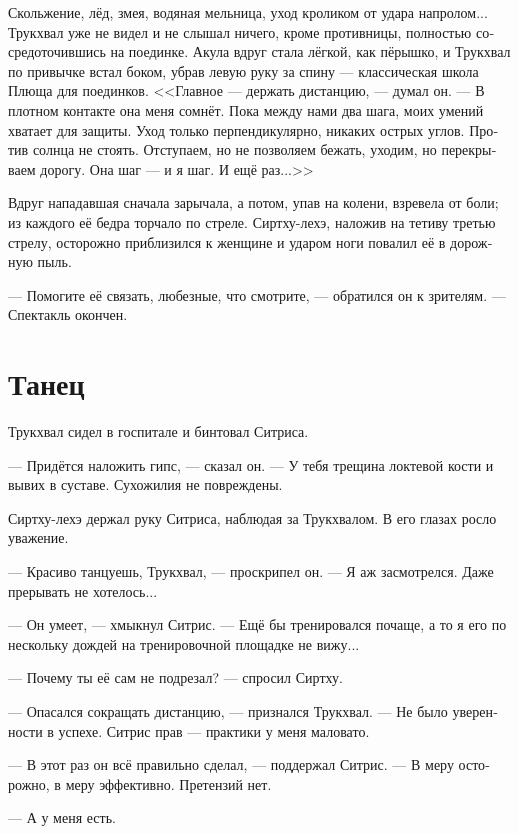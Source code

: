 \documentclass[a4paper,12pt,fleqn]{book}\usepackage{polyglossia}\setdefaultlanguage[babelshorthands=true]{russian}\setotherlanguage{english}\defaultfontfeatures{Ligatures=TeX,Mapping=tex-text}\usepackage{xcolor}\newcommand{\ml}[3]{#2}
\begin{document}
Скольжение, лёд, змея, водяная мельница, уход кроликом от удара напролом...
Трукхвал уже не видел и не слышал ничего, кроме противницы, полностью сосредоточившись на поединке.
Акула вдруг стала лёгкой, как пёрышко, и Трукхвал по привычке встал боком, убрав левую руку за спину --- классическая школа Плюща для поединков.
<<Главное --- держать дистанцию, --- думал он.
--- В плотном контакте она меня сомнёт.
Пока между нами два шага, моих умений хватает для защиты.
Уход только перпендикулярно, никаких острых углов.
Против солнца не стоять.
Отступаем, но не позволяем бежать, уходим, но перекрываем дорогу.
Она шаг --- и я шаг.
И ещё раз...>>

Вдруг нападавшая сначала зарычала, а потом, упав на колени, взревела от боли;
из каждого её бедра торчало по стреле.
Сиртху-лехэ, наложив на тетиву третью стрелу, осторожно приблизился к женщине и ударом ноги повалил её в дорожную пыль.

--- Помогите её связать, любезные, что смотрите, --- обратился он к зрителям.
--- Спектакль окончен.

\section{Танец}

Трукхвал сидел в госпитале и бинтовал Ситриса.

--- Придётся наложить гипс, --- сказал он.
--- У тебя трещина локтевой кости и вывих в суставе.
Сухожилия не повреждены.

Сиртху-лехэ держал руку Ситриса, наблюдая за Трукхвалом.
В его глазах росло уважение.

--- Красиво танцуешь, Трукхвал, --- проскрипел он.
--- Я аж засмотрелся.
Даже прерывать не хотелось...

--- Он умеет, --- хмыкнул Ситрис.
--- Ещё бы тренировался почаще, а то я его по нескольку дождей на тренировочной площадке не вижу...

--- Почему ты её сам не подрезал? --- спросил Сиртху.

--- Опасался сокращать дистанцию, --- признался Трукхвал.
--- Не было уверенности в успехе.
Ситрис прав --- практики у меня маловато.

--- В этот раз он всё правильно сделал, --- поддержал Ситрис.
\ml{$0$}
{--- В меру осторожно, в меру эффективно.}
{``Enough of caution, enough of efficiency.}
\ml{$0$}
{Претензий нет.}
{I wouldn't reproach him.''}

\ml{$0$}
{--- А у меня есть.}
{``But I would.''}
\end{document}
